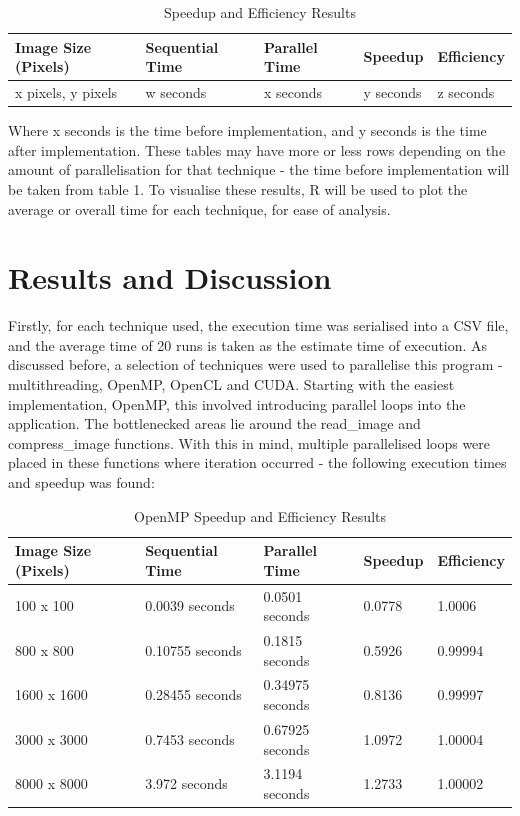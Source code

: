 \documentclass[12pt, a4paper]{article}
\begin{document}
\begin{table}[H]
    \centering
    \begin{tabular}{| l | l | l | l | l |}
    \hline
    Image Size (Pixels) & Sequential Time & Parallel Time & Speedup & Efficiency\\ \hline
    x pixels, y pixels & w seconds & x seconds & y seconds & z seconds \\ \hline
    \end{tabular}
    \caption{Speedup and Efficiency Results}
\end{table}

Where x seconds is the time before implementation, and y seconds is the time after implementation. These tables may have more or less rows depending on the amount of parallelisation for that technique - the time before implementation will be taken from table 1. To visualise these results, R will be used to plot the average or overall time for each technique, for ease of analysis.

\section{Results and Discussion}
Firstly, for each technique used, the execution time was serialised into a CSV file, and the average time of 20 runs is taken as the estimate time of execution. As discussed before, a selection of techniques were used to parallelise this program - multithreading, OpenMP, OpenCL and CUDA. Starting with the easiest implementation, OpenMP, this involved introducing parallel loops into the application. The bottlenecked areas lie around the read\_image and compress\_image functions. With this in mind, multiple parallelised loops were placed in these functions where iteration occurred - the following execution times and speedup was found:

\begin{table}[H]
    \centering
    \begin{tabular}{| l | l | l | l | l |}
    \hline
    Image Size (Pixels) & Sequential Time & Parallel Time & Speedup & Efficiency \\ \hline
    100 x 100 & 0.0039 seconds & 0.0501 seconds & 0.0778 & 1.0006 \\ \hline
    800 x 800 & 0.10755 seconds & 0.1815 seconds & 0.5926 & 0.99994 \\ \hline
    1600 x 1600 & 0.28455 seconds & 0.34975 seconds & 0.8136 & 0.99997 \\ \hline
    3000 x 3000 & 0.7453 seconds & 0.67925 seconds & 1.0972 & 1.00004 \\ \hline
    8000 x 8000 & 3.972 seconds & 3.1194 seconds & 1.2733 & 1.00002 \\ \hline
    \end{tabular}
    \caption{OpenMP Speedup and Efficiency Results}
\end{table}
\end{document}
